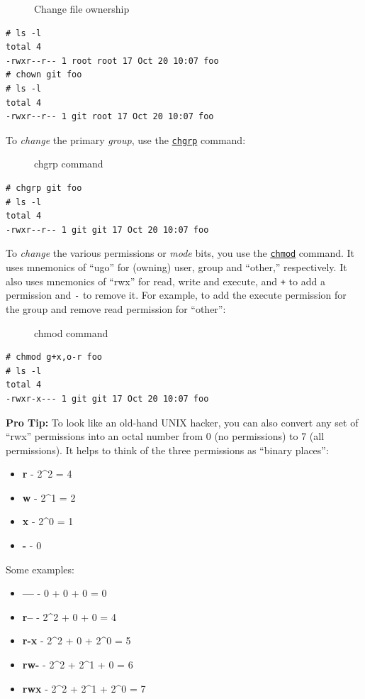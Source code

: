 \documentclass[10pt,]{book}
\numberwithin{figure}{chapter}
\DeclareRobustCommand{\drcap}[1]{\begin{figure}[H]\caption{#1}\end{figure}}
\DeclareRobustCommand{\drcmd}[1]{\index{Commands!#1}}
\begin{document}
\drcap{Change file ownership}

\begin{verbatim}
# ls -l
total 4
-rwxr--r-- 1 root root 17 Oct 20 10:07 foo
# chown git foo
# ls -l
total 4
-rwxr--r-- 1 git root 17 Oct 20 10:07 foo
\end{verbatim}

To \emph{change} the primary \emph{group}, use the
\href{http://linux.die.net/man/1/chgrp}{\texttt{chgrp}}\drcmd{chgrp}
command:

\drcap{chgrp command}

\begin{verbatim}
# chgrp git foo
# ls -l
total 4
-rwxr--r-- 1 git git 17 Oct 20 10:07 foo
\end{verbatim}

To \emph{change} the various permissions or \emph{mode} bits, you use
the \href{http://linux.die.net/man/1/chmod}{\texttt{chmod}}\drcmd{chmod}
command. It uses mnemonics of ``ugo'' for (owning) user, group and
``other,'' respectively. It also uses mnemonics of ``rwx'' for read,
write and execute, and \texttt{+} to add a permission and \texttt{-} to
remove it. For example, to add the execute permission for the group and
remove read permission for ``other'':

\drcap{chmod command}

\begin{verbatim}
# chmod g+x,o-r foo
# ls -l
total 4
-rwxr-x--- 1 git git 17 Oct 20 10:07 foo
\end{verbatim}

\textbf{Pro Tip:} To look like an old-hand UNIX hacker, you can also
convert any set of ``rwx'' permissions into an octal number from 0 (no
permissions) to 7 (all permissions). It helps to think of the three
permissions as ``binary places'':

\begin{itemize}
\itemsep1pt\parskip0pt
\item
  \textbf{r} - 2\^{}2 = 4
\item
  \textbf{w} - 2\^{}1 = 2
\item
  \textbf{x} - 2\^{}0 = 1
\item
  \textbf{-} - 0
\end{itemize}

Some examples:

\begin{itemize}
\itemsep1pt\parskip0pt
\item
  \textbf{---} - 0 + 0 + 0 = 0
\item
  \textbf{r--} - 2\^{}2 + 0 + 0 = 4
\item
  \textbf{r-x} - 2\^{}2 + 0 + 2\^{}0 = 5
\item
  \textbf{rw-} - 2\^{}2 + 2\^{}1 + 0 = 6
\item
  \textbf{rwx} - 2\^{}2 + 2\^{}1 + 2\^{}0 = 7
\end{itemize}
\end{document}
